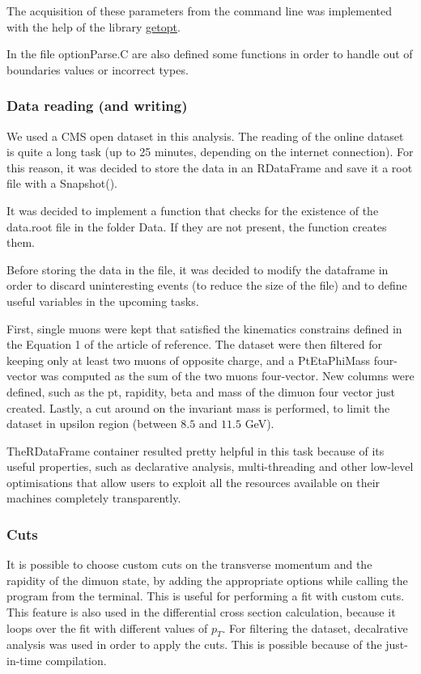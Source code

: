\documentclass[a4paper,11pt]{article}
\begin{document}
The acquisition of these parameters from the command line was implemented with the help of the library \href{https://man7.org/linux/man-pages/man3/getopt.3.html}{getopt}.

In the file optionParse.C are also defined some functions in order to handle out of boundaries values or incorrect types.

\subsubsection{Data reading (and writing)}
We used a CMS open dataset in this analysis. The reading of the online dataset is quite a long task (up to 25 minutes, depending on the internet connection). For this reason, it was decided to store the data in an RDataFrame and save it a root file with a Snapshot().


It was decided to implement a function that checks for the existence of the data.root file in the folder Data. If they are not present, the function creates them.

Before storing the data in the file, it was decided to modify the dataframe in order to discard uninteresting events (to reduce the size of the file) and to define useful variables in the upcoming tasks.

First, single muons were kept that satisfied the kinematics constrains defined in the Equation 1 of the article of reference. The dataset were then filtered for keeping only at least two muons of opposite charge, and a PtEtaPhiMass four-vector was computed as the sum of the two muons four-vector. New columns were defined, such as the pt, rapidity, beta and mass of the dimuon four vector just created. Lastly, a cut around on the invariant mass is performed, to limit the dataset in upsilon region (between $8.5$ and $11.5$ GeV).

 TheRDataFrame container resulted pretty helpful in this task because of its useful properties, such as declarative analysis, multi-threading and other low-level optimisations that allow users to exploit all the resources available on their machines completely transparently.
 
\subsubsection{Cuts}
It is possible to choose custom cuts on the transverse momentum and the rapidity of the dimuon state, by adding the appropriate options while calling the program from the terminal. This is useful for performing a fit with custom cuts. This feature is also used in the differential cross section calculation, because it loops over the fit with different values of $p_T$.
For filtering the dataset, decalrative analysis was used in order to apply the cuts. This is possible because of the just-in-time compilation.
\end{document}
